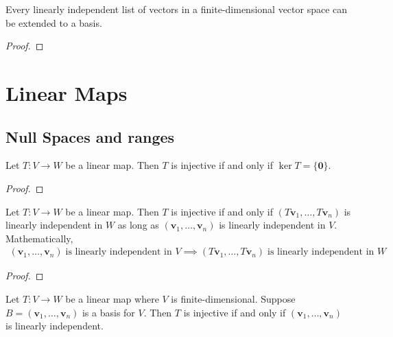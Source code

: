 \documentclass[thmcnt=section, color=blue, 12pt]{my-elegantbook}
\begin{document}

\begin{theorem} \label{thm:10}
    Every linearly independent list of vectors in a finite-dimensional vector space can be extended to a basis.
\end{theorem}

\begin{proof}
\end{proof}


\chapter{Linear Maps}

\section{Null Spaces and ranges}

\begin{theorem} \label{thm:4}
    Let $T: V \to W$ be a linear map. Then $T$ is injective if and only if $\ker T = \{\mathbf{0}\}$.
\end{theorem}

\begin{proof}
\end{proof}


\begin{corollary} \label{cor:1}
    Let $T: V \to W$ be a linear map. Then $T$ is injective if and only if $(T\mathbf{v}_1, \ldots, T\mathbf{v}_n)$ is linearly independent in $W$ as long as $(\mathbf{v}_1, \ldots, \mathbf{v}_n)$ is linearly independent in $V$. Mathematically,
    \begin{align*}
        (\mathbf{v}_1, \ldots, \mathbf{v}_n) \; \text{is linearly independent in $V$}
        \implies 
        (T\mathbf{v}_1, \ldots, T\mathbf{v}_n) \; \text{is linearly independent in $W$}
    \end{align*}
\end{corollary}

\begin{proof}
\end{proof}


\begin{corollary} \label{cor:2}
    Let $T: V \to W$ be a linear map where $V$ is finite-dimensional. Suppose $B = (\mathbf{v}_1, \ldots, \mathbf{v}_n)$ is a basis for $V$. Then $T$ is injective if and only if $(\mathbf{v}_1, \ldots, \mathbf{v}_n)$ is linearly independent.
\end{corollary}
\end{document}
